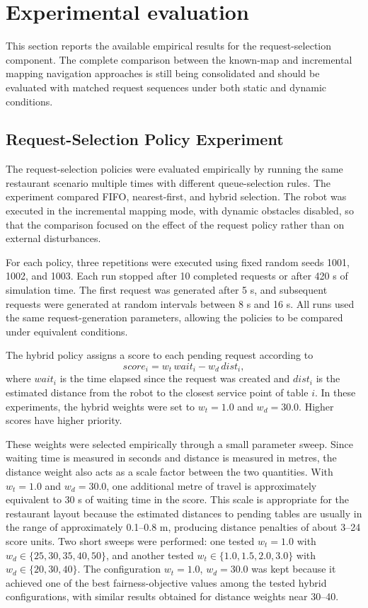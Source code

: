 \documentclass[conference]{IEEEtran}
\begin{document}
\section{Experimental evaluation}

This section reports the available empirical results for the
request-selection component. The complete comparison between the known-map and
incremental mapping navigation approaches is still being consolidated and
should be evaluated with matched request sequences under both static and
dynamic conditions.

\subsection{Request-Selection Policy Experiment}

The request-selection policies were evaluated empirically by running the same
restaurant scenario multiple times with different queue-selection rules. The
experiment compared FIFO, nearest-first, and hybrid selection. The robot was
executed in the incremental mapping mode, with dynamic obstacles disabled, so
that the comparison focused on the effect of the request policy rather than on
external disturbances.

For each policy, three repetitions were executed using fixed random seeds
1001, 1002, and 1003. Each run stopped after 10 completed requests or after
420 s of simulation time. The first request was generated after 5 s, and
subsequent requests were generated at random intervals between 8 s and 16 s.
All runs used the same request-generation parameters, allowing the policies to
be compared under equivalent conditions.

The hybrid policy assigns a score to each pending request according to
\begin{equation}
score_i = w_t\,wait_i - w_d\,dist_i,
\end{equation}
where $wait_i$ is the time elapsed since the request was created and $dist_i$
is the estimated distance from the robot to the closest service point of table
$i$. In these experiments, the hybrid weights were set to $w_t=1.0$ and
$w_d=30.0$. Higher scores have higher priority.

These weights were selected empirically through a small parameter sweep. Since
waiting time is measured in seconds and distance is measured in metres, the
distance weight also acts as a scale factor between the two quantities. With
$w_t=1.0$ and $w_d=30.0$, one additional metre of travel is approximately
equivalent to 30 s of waiting time in the score. This scale is appropriate for
the restaurant layout because the estimated distances to pending tables are
usually in the range of approximately 0.1--0.8 m, producing distance penalties
of about 3--24 score units. Two short sweeps were performed: one tested
$w_t=1.0$ with $w_d \in \{25,30,35,40,50\}$, and another tested
$w_t \in \{1.0,1.5,2.0,3.0\}$ with $w_d \in \{20,30,40\}$. The configuration
$w_t=1.0$, $w_d=30.0$ was kept because it achieved one of the best
fairness-objective values among the tested hybrid configurations, with similar
results obtained for distance weights near 30--40.
\end{document}
